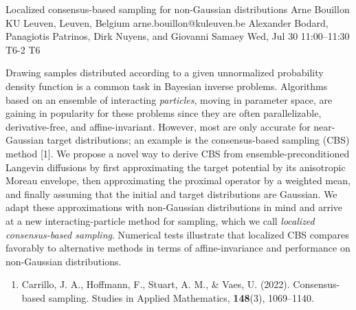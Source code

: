 \begin{talk}
  {Localized consensus-based sampling for non-Gaussian distributions}%
  {Arne Bouillon}%
  {KU Leuven, Leuven, Belgium}%
  {arne.bouillon@kuleuven.be}%
  {Alexander Bodard, Panagiotis Patrinos, Dirk Nuyens, and Giovanni Samaey}%
  {}%
  {Wed, Jul 30 11:00--11:30}%
  {T6-2}%
  {T6}%
  
    

  Drawing samples distributed according to a given unnormalized probability density function is a common task in Bayesian inverse problems. Algorithms based on an ensemble of interacting \emph{particles}, moving in parameter space, are gaining in popularity for these problems since they are often parallelizable, derivative-free, and affine-invariant. However, most are only accurate for near-Gaussian target distributions; an example is the consensus-based sampling (CBS) method [1]. We propose a novel way to derive CBS from ensemble-preconditioned Langevin diffusions by first approximating the target potential by its anisotropic Moreau envelope, then approximating the proximal operator by a weighted mean, and finally assuming that the initial and target distributions are Gaussian. We adapt these approximations with non-Gaussian distributions in mind and arrive at a new interacting-particle method for sampling, which we call \emph{localized consensus-based sampling}. Numerical tests illustrate that localized CBS compares favorably to alternative methods in terms of affine-invariance and performance on non-Gaussian distributions.
\medskip

\begin{enumerate}
  \item[{[1]}] Carrillo, J. A., Hoffmann, F., Stuart, A. M., \& Vaes, U. (2022). Consensus-based sampling. Studies in Applied Mathematics, \textbf{148}(3), 1069--1140.
\end{enumerate}
\end{talk}


